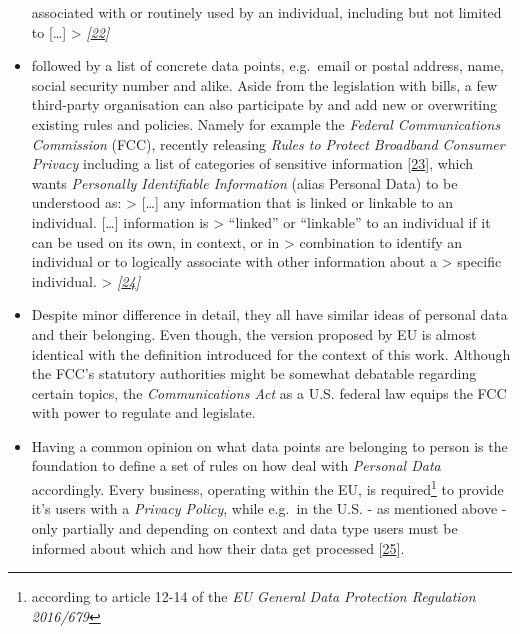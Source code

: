 \documentclass[12pt,english,a4paper,titlepage,cleardoublepage=empty,dottedtoc]{report}
\begin{document}
\begin{itemize}
  associated with or routinely used by an individual, including but not
  limited to {[}\ldots{}{]} \textgreater{}
  \emph{{[}\protect\hyperlink{ref-bill-draft_2015_us_consumer-privacy-bill-of-rights-act_definition}{22}{]}}
\item
  followed by a list of concrete data points, e.g.~email or postal
  address, name, social security number and alike. Aside from the
  legislation with bills, a few third-party organisation can also
  participate by and add new or overwriting existing rules and policies.
  Namely for example the \emph{Federal Communications Commission} (FCC),
  recently releasing \emph{Rules to Protect Broadband Consumer Privacy}
  including a list of categories of sensitive information
  {[}\protect\hyperlink{ref-rules_2016_fcc_to-protect-broadband-consumer-privacy_sensitive-types-of-data}{23}{]},
  which wants \emph{Personally Identifiable Information} (alias Personal
  Data) to be understood as: \textgreater{} {[}\ldots{}{]} any
  information that is linked or linkable to an individual.
  {[}\ldots{}{]} information is \textgreater{} ``linked'' or
  ``linkable'' to an individual if it can be used on its own, in
  context, or in \textgreater{} combination to identify an individual or
  to logically associate with other information about a \textgreater{}
  specific individual. \textgreater{}
  \emph{{[}\protect\hyperlink{ref-rules_2016_fcc_to-protect-broadband-consumer-privacy_personally-identifiable-information}{24}{]}}
\item
  Despite minor difference in detail, they all have similar ideas of
  personal data and their belonging. Even though, the version proposed
  by EU is almost identical with the definition introduced for the
  context of this work. Although the FCC's statutory authorities might
  be somewhat debatable regarding certain topics, the
  \emph{Communications Act} as a U.S. federal law equips the FCC with
  power to regulate and legislate.
\item
  Having a common opinion on what data points are belonging to person is
  the foundation to define a set of rules on how deal with
  \emph{Personal Data} accordingly. Every business, operating within the
  EU, is required\footnote{according to article 12-14 of the \emph{EU
    General Data Protection Regulation 2016/679}} to provide it's users
  with a \emph{Privacy Policy}, while e.g.~in the U.S. - as mentioned
  above - only partially and depending on context and data type users
  must be informed about which and how their data get processed
  {[}\protect\hyperlink{ref-web_2016_privacy-policies-are-mandatory-by-law}{25}{]}.

\end{itemize}
\end{document}
